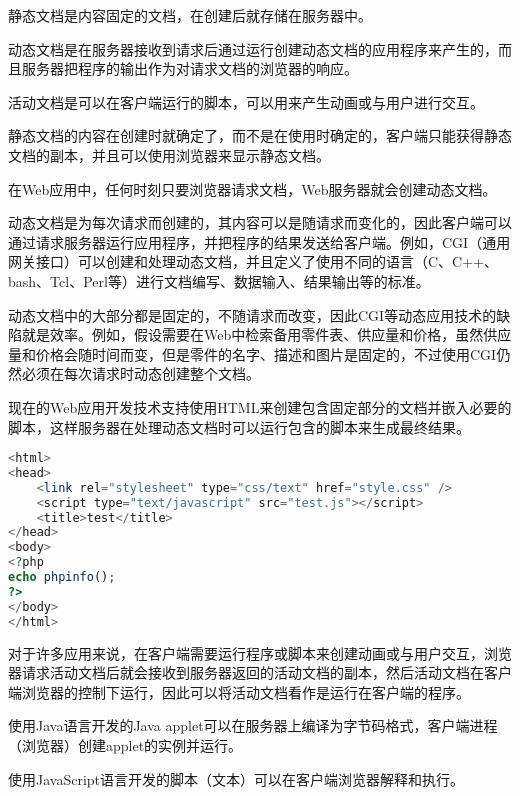 \begin{compactitem}
\item 静态文档是内容固定的文档，在创建后就存储在服务器中。
\item 动态文档是在服务器接收到请求后通过运行创建动态文档的应用程序来产生的，而且服务器把程序的输出作为对请求文档的浏览器的响应。
\item 活动文档是可以在客户端运行的脚本，可以用来产生动画或与用户进行交互。
\end{compactitem}

静态文档的内容在创建时就确定了，而不是在使用时确定的，客户端只能获得静态文档的副本，并且可以使用浏览器来显示静态文档。

在Web应用中，任何时刻只要浏览器请求文档，Web服务器就会创建动态文档。

动态文档是为每次请求而创建的，其内容可以是随请求而变化的，因此客户端可以通过请求服务器运行应用程序，并把程序的结果发送给客户端。例如，CGI（通用网关接口）可以创建和处理动态文档，并且定义了使用不同的语言（C、C++、bash、Tcl、Perl等）进行文档编写、数据输入、结果输出等的标准。

动态文档中的大部分都是固定的，不随请求而改变，因此CGI等动态应用技术的缺陷就是效率。例如，假设需要在Web中检索备用零件表、供应量和价格，虽然供应量和价格会随时间而变，但是零件的名字、描述和图片是固定的，不过使用CGI仍然必须在每次请求时动态创建整个文档。

现在的Web应用开发技术支持使用HTML来创建包含固定部分的文档并嵌入必要的脚本，这样服务器在处理动态文档时可以运行包含的脚本来生成最终结果。

\begin{lstlisting}[language=PHP]
<html>
<head>
	<link rel="stylesheet" type="css/text" href="style.css" />
	<script type="text/javascript" src="test.js"></script>
	<title>test</title>
</head>
<body>
<?php
echo phpinfo();
?>
</body>
</html>
\end{lstlisting}

对于许多应用来说，在客户端需要运行程序或脚本来创建动画或与用户交互，浏览器请求活动文档后就会接收到服务器返回的活动文档的副本，然后活动文档在客户端浏览器的控制下运行，因此可以将活动文档看作是运行在客户端的程序。


\begin{compactitem}
\item 使用Java语言开发的Java applet可以在服务器上编译为字节码格式，客户端进程（浏览器）创建applet的实例并运行。
\item 使用JavaScript语言开发的脚本（文本）可以在客户端浏览器解释和执行。
\end{compactitem}






